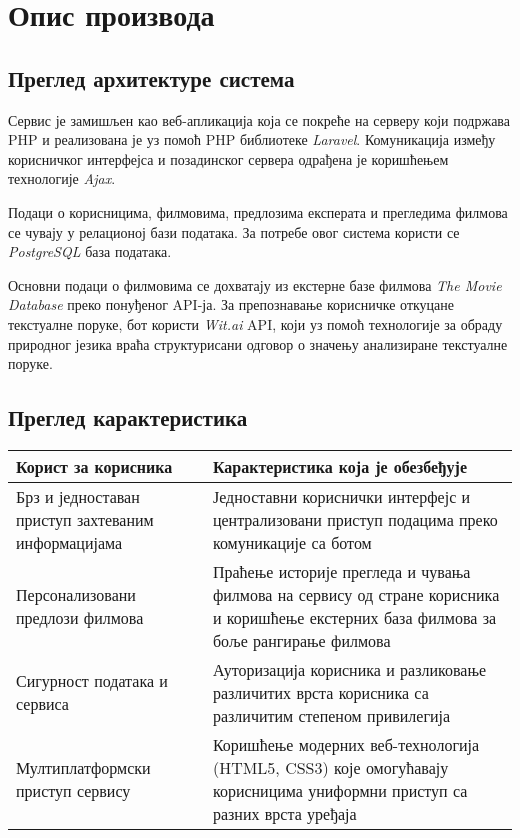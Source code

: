 \section{Опис производа}

\subsection{Преглед архитектуре система}

Сервис је замишљен као веб-апликација која се покреће на серверу који подржава PHP и реализована је
уз помоћ PHP библиотеке \textit{Laravel}. Комуникација између корисничког интерфејса и позадинског
сервера одрађена је коришћењем технологије \textit{Ajax}.

Подаци о корисницима, филмовима, предлозима експерата и прегледима филмова се чувају у
релационој бази података. За потребе овог система користи се \textit{PostgreSQL} база података.

Основни подаци о филмовима се дохватају из екстерне базе филмова \textit{The Movie Database} преко
понуђеног API-ја. За препознавање корисничке откуцане текстуалне поруке, бот користи \textit{Wit.ai} API,
који уз помоћ технологије за обраду природног језика враћа структурисани одговор о значењу анализиране
текстуалне поруке.

\subsection{Преглед карактеристика}

\noindent
\setcellgapes{4pt}
\makegapedcells
\begin{tabularx}{\linewidth}{|X|X|}
    \hline
    \textbf{Корист за корисника} & \textbf{Карактеристика која је обезбеђује} \\
    \hline
    Брз и једноставан приступ захтеваним информацијама & Једноставни кориснички интерфејс и
    централизовани приступ подацима преко комуникације са ботом \\
    \hline
    Персонализовани предлози филмова & Праћење историје прегледа и чувања филмова на сервису
    од стране корисника и коришћење екстерних база филмова за боље рангирање филмова \\
    \hline
    Сигурност података и сервиса & Ауторизација корисника и разликовање различитих врста
    корисника са различитим степеном привилегија \\
    \hline
    Мултиплатформски приступ сервису & Коришћење модерних веб-технологија (HTML5, CSS3) које
    омогућавају корисницима униформни приступ са разних врста уређаја \\
    \hline
\end{tabularx}
